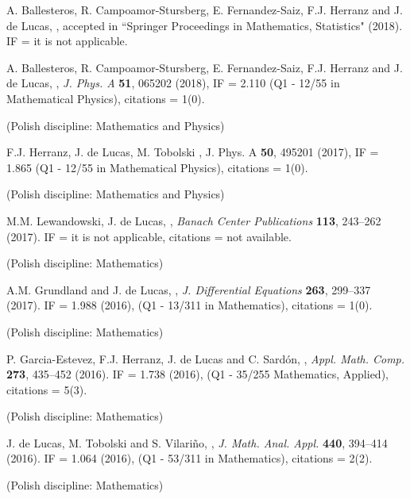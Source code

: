 \documentclass[12pt,reqno]{amsbook}
\begin{document}
\begin{enumerate}
{ \item A. Ballesteros, R. Campoamor-Stursberg, E. Fernandez-Saiz, F.J. Herranz and J. de Lucas, \color{black},  accepted in ``Springer Proceedings in Mathematics, Statistics" (2018). IF = it is not applicable.}

{ \item A. Ballesteros, R. Campoamor-Stursberg, E. Fernandez-Saiz, F.J. Herranz and J. de Lucas, \color{blue}{Poisson-Hopf algebra deformations of Lie-Hamilton systems}\color{black}, {\it J. Phys. A} {\bf 51}, 065202  (2018), IF = 2.110 (Q1 - 12/55 in Mathematical Physics), citations = 1(0).} (Polish discipline: Mathematics and Physics)

{ \item F.J. Herranz, J. de Lucas, M. Tobolski \color{blue}{Lie-Hamilton systems on curved spaces: A geometrical approach}\color{black},  J. Phys. A {\bf 50},  495201 (2017), IF = 1.865 (Q1 - 12/55 in Mathematical Physics), citations = 1(0).} (Polish discipline: Mathematics and Physics)

{ \item M.M. Lewandowski, J. de Lucas, \color{black}, {\it Banach Center Publications} {\bf 113}, 243--262 (2017). IF = it is not applicable, citations = not available.} (Polish discipline: Mathematics)

{ \item A.M. Grundland and J. de Lucas, \color{blue}{A Lie systems approach to the Riccati hierarchy and partial differential equations}\color{black}, {\it J. Differential Equations} {\bf 263}, 299--337 (2017). IF = 1.988 (2016), (Q1 - 13/311 in Mathematics), citations = 1(0).} (Polish discipline: Mathematics)

{ \item P. Garcia-Estevez, F.J. Herranz, J. de Lucas and C. Sard\'on, \color{blue}{Lie symmetries for Lie systems: Applications to systems of ODEs and PDEs}\color{black}, {\it Appl. Math. Comp.} {\bf 273}, 435--452 (2016). IF = 1.738 (2016), (Q1 - 35/255 Mathematics, Applied), citations = 5(3). }  (Polish discipline: Mathematics)

{ \item J. de Lucas, M. Tobolski and S. Vilariño, \color{blue}{Geometry of Riccati equations over normed division algebras}\color{black}, {\it J. Math. Anal. Appl.} {\bf 440}, 394--414 (2016). IF = 1.064 (2016), (Q1 - 53/311 in Mathematics), citations = 2(2). } (Polish discipline: Mathematics)


\end{enumerate}
\end{document}
